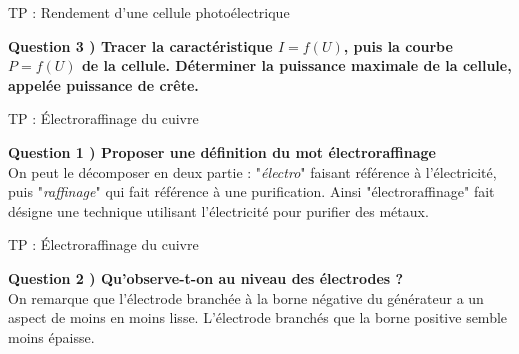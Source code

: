 \documentclass{beamer}
\begin{document}
\begin{frame}{TP : Rendement d'une cellule photoélectrique}
\begin{minipage}{\linewidth}
\textbf{Question 3 ) Tracer la caractéristique $I=f(U)$, puis la courbe $P=f(U)$ de la cellule. Déterminer la puissance maximale de la cellule, appelée puissance de crête.}\\
\end{minipage}

\begin{minipage}{.5\linewidth}
\end{minipage}\begin{minipage}{.5\linewidth}
\end{minipage}

\begin{minipage}{.5\linewidth}
\end{minipage}\begin{minipage}{.5\linewidth}
\end{minipage}

\end{frame}






\begin{frame}{TP : Électroraffinage du cuivre}
	\begin{minipage}{\linewidth}
	\textbf{Question 1 ) Proposer une définition du mot électroraffinage}\\

	On peut le décomposer en deux partie : "\emph{électro}" faisant référence à l'électricité, puis "\emph{raffinage}" qui fait référence à une purification. Ainsi "électroraffinage" fait désigne une technique utilisant l'électricité  pour purifier des métaux.
	\end{minipage}
	\end{frame}

\begin{frame}{TP : Électroraffinage du cuivre}
	\begin{minipage}{\linewidth}
	\textbf{Question 2 ) Qu'observe-t-on au niveau des électrodes ?}\\
	On remarque que l'électrode branchée à la borne négative du générateur a un aspect de moins en moins lisse.  L'électrode branchés que la borne positive semble moins épaisse.
	\end{minipage}
	\end{frame}
	
\end{document}
